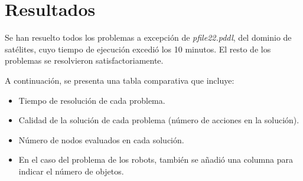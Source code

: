 \documentclass{article}
\begin{document}
\section{Resultados}
Se han resuelto todos los problemas a excepción de \textit{pfile22.pddl}, del dominio de satélites, cuyo tiempo de ejecución excedió los 10 minutos. El resto de los problemas se resolvieron satisfactoriamente.

A continuación, se presenta una tabla comparativa que incluye:
\begin{itemize}
    \item Tiempo de resolución de cada problema.
    \item Calidad de la solución de cada problema (número de acciones en la solución).
    \item Número de nodos evaluados en cada solución.
    \item En el caso del problema de los robots, también se añadió una columna para indicar el número de objetos.
\end{itemize}
\end{document}
